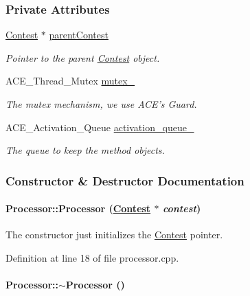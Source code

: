 \subsubsection*{Private Attributes}
\begin{CompactItemize}
\item 
\hyperlink{classContest}{Contest} $\ast$ \hyperlink{classProcessor_Processoro0}{parent\-Contest}
\begin{CompactList}\small\item\em Pointer to the parent \hyperlink{classContest}{Contest} object.\item\end{CompactList}\item 
ACE\_\-Thread\_\-Mutex \hyperlink{classProcessor_Processoro1}{mutex\_\-}
\begin{CompactList}\small\item\em The mutex mechanism, we use ACE's Guard.\item\end{CompactList}\item 
ACE\_\-Activation\_\-Queue \hyperlink{classProcessor_Processoro2}{activation\_\-queue\_\-}
\begin{CompactList}\small\item\em The queue to keep the method objects.\item\end{CompactList}\end{CompactItemize}


\subsubsection{Constructor \& Destructor Documentation}
\hypertarget{classProcessor_Processora0}{
\paragraph[Processor]{\setlength{\rightskip}{0pt plus 5cm}Processor::Processor (\hyperlink{classContest}{Contest} $\ast$ {\em contest})}\hfill}
\label{classProcessor_Processora0}


The constructor just initializes the \hyperlink{classContest}{Contest} pointer. 

Definition at line 18 of file processor.cpp.\hypertarget{classProcessor_Processora1}{
\paragraph[$\sim$Processor]{\setlength{\rightskip}{0pt plus 5cm}Processor::$\sim$Processor ()}\hfill}
\label{classProcessor_Processora1}


